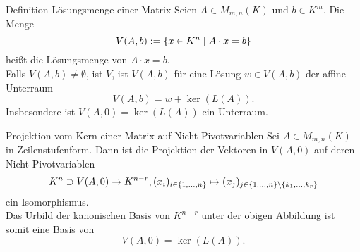 \documentclass[main.tex]{subfiles}
\begin{document}
\begin{karte}{Definition Lösungsmenge einer Matrix}
    Seien \( A \in M_{m,n}(K) \) und \( b \in K^m \). Die Menge 
    \[ V(A,b) := \{ x \in K^n \;\vert \; A \cdot x = b \} \]
    heißt die Lösungsmenge von \( A \cdot x = b \).\\
    Falls \( V(A,b) \neq \emptyset \), ist \(V\), ist 
    \( V(A,b) \) für eine  Lösung \( w\in V(A,b) \) 
    der affine Unterraum 
    \[ V(A,b) = w + \ker(L(A)). \]
    Insbesondere ist \( V(A,0) = \ker(L(A)) \) ein Unterraum.
\end{karte}
\begin{karte}{Projektion vom Kern einer Matrix auf Nicht-Pivotvariablen}
    Sei \( A \in M_{m,n}(K) \) in Zeilenstufenform. Dann ist die 
    Projektion der Vektoren in \( V(A,0) \) auf deren Nicht-Pivotvariablen 
    \[ K^n \supset V(A,0) \rightarrow K^{n-r}, (x_i)_{i\in\{1,\ldots,n\}} 
    \mapsto (x_j)_{j\in\{1,\ldots,n\}\setminus\{k_1,\ldots,k_r\}} \]
    ein Isomorphismus.\\
    Das Urbild der kanonischen Basis von \( K^{n-r} \) unter der obigen 
    Abbildung ist somit eine Basis von 
    \[ V(A,0) = \ker(L(A)). \]
\end{karte}
\end{document}
